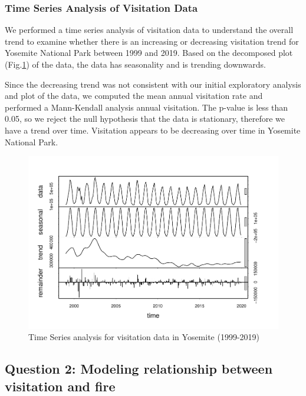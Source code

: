 \documentclass[
  12pt,
]{article}
\begin{document}
\hypertarget{time-series-analysis-of-visitation-data}{%
\subsubsection{Time Series Analysis of Visitation Data}\label{time-series-analysis-of-visitation-data}}

We performed a time series analysis of visitation data to understand the overall trend to examine whether there is an increasing or decreasing visitation trend for Yosemite National Park between 1999 and 2019. Based on the decomposed plot (Fig.\ref{fig:TSplotvisit}) of the data, the data has seasonality and is trending downwards.

Since the decreasing trend was not consistent with our initial exploratory analysis and plot of the data, we computed the mean annual visitation rate and performed a Mann-Kendall analysis annual visitation. The p-value is less than 0.05, so we reject the null hypothesis that the data is stationary, therefore we have a trend over time. Visitation appears to be decreasing over time in Yosemite National Park.

\begin{figure}
\centering
\includegraphics{CodeFinal_files/figure-latex/TSplotvisit-1.pdf}
\caption{\label{fig:TSplotvisit}Time Series analysis for visitation data in Yosemite (1999-2019)}
\end{figure}

\hypertarget{question-2-modeling-relationship-between-visitation-and-fire}{%
\subsection{Question 2: Modeling relationship between visitation and fire}\label{question-2-modeling-relationship-between-visitation-and-fire}}
\end{document}
